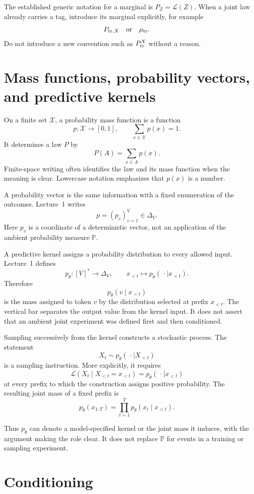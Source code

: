 \documentclass[11pt]{article}
\renewcommand{\P}{\mathbb P}
\newcommand{\Law}{\mathcal L}
\begin{document}
The established generic notation for a marginal is \(P_Z=\Law(Z)\). When a
joint law already carries a tag, introduce its marginal explicitly, for
example
\[
 P_{{\rm tr},X}
 \quad\text{or}\quad
 \mu_{\rm tr}.
\]
Do not introduce a new convention such as \(P_{\rm tr}^X\) without a reason.

\section{Mass functions, probability vectors, and predictive kernels}

On a finite set \(\mathcal X\), a probability mass function is a function
\[
 p:\mathcal X\to[0,1],
 \qquad
 \sum_{x\in\mathcal X}p(x)=1.
\]
It determines a law \(P\) by
\[
 P(A)=\sum_{x\in A}p(x).
\]
Finite-space writing often identifies the law and its mass function when the
meaning is clear. Lowercase notation emphasizes that \(p(x)\) is a number.

A probability vector is the same information with a fixed enumeration of the
outcomes. Lecture~1 writes
\[
 p=(p_v)_{v=1}^V\in\Delta_V.
\]
Here \(p_v\) is a coordinate of a deterministic vector, not an application of
the ambient probability measure \(\P\).

A predictive kernel assigns a probability distribution to every allowed
input. Lecture~1 defines
\[
 p_\theta:[V]^*\to\Delta_V,
 \qquad
 x_{<t}\longmapsto p_\theta(\,\cdot\mid x_{<t}).
\]
Therefore
\[
 p_\theta(v\mid x_{<t})
\]
is the mass assigned to token \(v\) by the distribution selected at prefix
\(x_{<t}\). The vertical bar separates the output value from the kernel input.
It does not assert that an ambient joint experiment was defined first and then
conditioned.

Sampling successively from the kernel constructs a stochastic process. The
statement
\[
 X_t\sim p_\theta(\,\cdot\mid X_{<t})
\]
is a sampling instruction. More explicitly, it requires
\[
 \Law(X_t\mid X_{<t}=x_{<t})
 =p_\theta(\,\cdot\mid x_{<t})
\]
at every prefix to which the construction assigns positive probability.
The resulting joint mass of a fixed prefix is
\[
 p_\theta(x_{1:T})
 =\prod_{t=1}^T p_\theta(x_t\mid x_{<t}).
\]

Thus \(p_\theta\) can denote a model-specified kernel or the joint mass it
induces, with the argument making the role clear. It does not replace \(\P\)
for events in a training or sampling experiment.

\section{Conditioning}
\end{document}
